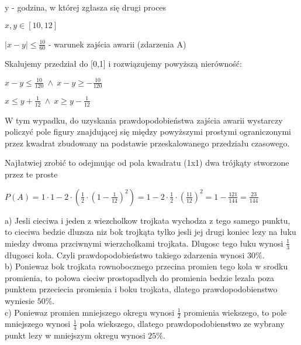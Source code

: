 \documentclass[fleqn]{article}
\begin{document}
y - godzina, w której zgłasza się drugi proces

$x,y \in [10,12]$

$|x-y|\le\frac{10}{60}$ - warunek zajścia awarii (zdarzenia A)

Skalujemy przedział do [0,1] i rozwiązujemy powyższą nierówność:

$x-y\le\frac{10}{120} \ \wedge \ x-y\ge-\frac{10}{120}$

$x\le y+\frac{1}{12} \ \wedge \ x\ge y-\frac{1}{12}$

W tym wypadku, do uzyskania prawdopodobieństwa zajścia awarii wystarczy policzyć pole figury znajdującej się między powyższymi prostymi ograniczonymi przez kwadrat zbudowany na podstawie przeskalowanego przedziału czasowego.

Najłatwiej zrobić to odejmując od pola kwadratu (1x1) dwa trójkąty stworzone przez te proste

$P(A)=1\cdot1-2\cdot(\frac{1}{2}\cdot(1-\frac{1}{12})^{2})=1-2\cdot\frac{1}{2}\cdot(\frac{11}{12})^{2}=1-\frac{121}{144}=\frac{23}{144}$
\medskip

\medskip

a) Jesli cieciwa i jeden z wiezcholkow trojkata wychodza z tego samego punktu, to cieciwa bedzie dluzsza niz bok trojkąta tylko jesli jej drugi koniec lezy na łuku miedzy dwoma przciwnymi wierzcholkami trojkata. Dlugosc tego łuku wynosi $\frac{1}{3}$ długosci koła. Czyli prawdopodobieństwo takiego zdarzenia wynosi $30\%$. \\

b) Poniewaz bok trojkata rownobocznego przecina promien tego kola w srodku promienia, to połowa cieciw prostopadlych do promienia bedzie lezala poza punktem przeciecia promienia i boku trojkata, dlatego prawdopodobienstwo wyniesie $50\%$.\\

c) Poniewaz promien mniejszego okregu wynosi $\frac{1}{2}$ promienia wiekszego, to pole mniejszego wynosi $\frac{1}{4}$ pola wiekszego, dlatego prawdopodobienstwo ze wybrany punkt lezy w mniejszym okregu wynosi $25\%$.\\

\medskip
\end{document}
